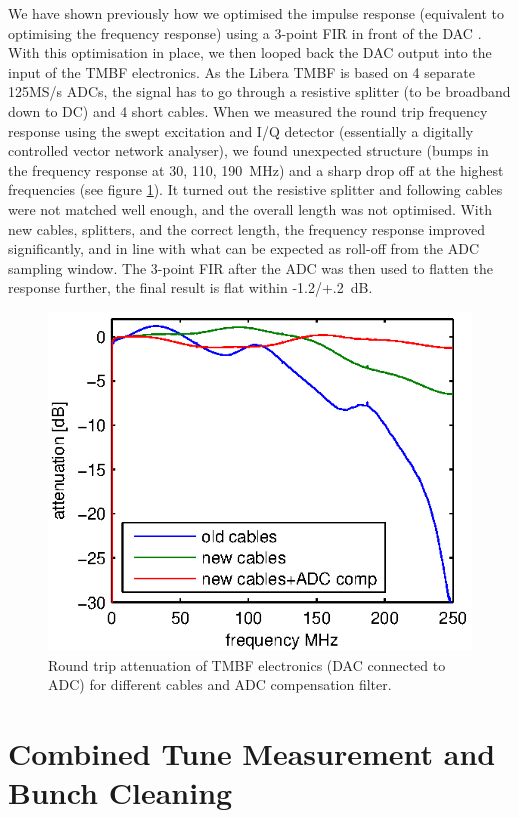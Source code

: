 \documentclass[a4paper]{jacow}
\begin{document}
We have shown previously how we optimised the impulse response (equivalent to optimising the frequency response) using a 3-point FIR in front of the DAC \cite{capabilities}. With this optimisation in place, we then looped back the DAC output into the input of the TMBF electronics. As the Libera TMBF is based on 4 separate 125MS/s ADCs, the signal has to go through a resistive splitter (to be broadband down to DC) and 4 short cables. When we measured the round trip frequency response using the swept excitation and I/Q detector (essentially a digitally controlled vector network analyser), we found unexpected structure (bumps in the frequency response at 30, 110, 190~MHz) and a sharp drop off at the highest frequencies (see figure \ref{cables}). It turned out the resistive splitter and following cables were not matched well enough, and the overall length was not optimised. With new cables, splitters, and the correct length, the frequency response improved significantly, and in line with what can be expected as roll-off from the ADC sampling window. The 3-point FIR after the ADC was then used to flatten the response further, the final result is flat within -1.2/+.2~dB.
\begin{figure}%
\includegraphics[width=\linewidth]{WEPD24_f2.eps}
\caption{Round trip attenuation of TMBF electronics (DAC connected to ADC) for different cables and ADC compensation filter.}
\label{cables}
\end{figure}

\section{Combined Tune Measurement and Bunch Cleaning}
\end{document}
